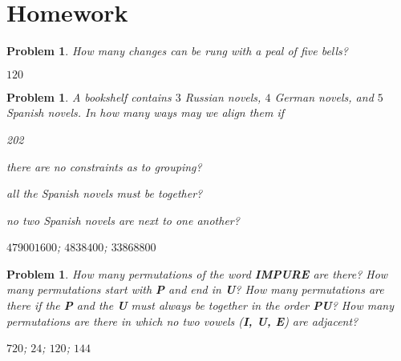 \documentclass[11pt, openany]{book}
\theoremstyle{change} \theoremheaderfont{\blue\sffamily\bfseries}
\newtheorem{pro}[thm]{Problem}
\theoremstyle{nonumberplain} \theoremheaderfont{\sffamily\bfseries}
\newcommand{\í}{\'{\i}}
\begin{document}
\section*{Homework}
\begin{multicols}{2}\columnseprule 1pt \columnsep 25pt
\begin{pro}
How many changes can be rung with a peal of five bells?
\begin{answer}$120$
\end{answer}
 \end{pro}
       \begin{pro}A bookshelf contains $3$
Russian novels, $4$ German novels, and $5$ Spanish novels. In how
many ways may we align them if\begin{dingautolist}{202} \item there
are no constraints as to grouping? \item
 all the Spanish novels must be together?  \item no
two Spanish novels are next to one  another?

\end{dingautolist}
\begin{answer}
$479001600$; $4838400$; $33868800$
\end{answer}
      \end{pro}
          \begin{pro}
How many permutations of the word {\bf IMPURE} are there? How many
permutations start with {\bf P} and end in {\bf U}?
 How many permutations are there if the {\bf P} and the {\bf U} must always be together in the order {\bf PU}?
 How many permutations are there in which no two vowels ({\bf I, U, E}) are adjacent?

\begin{answer}$720$; $24$; $120$; $144$


\end{answer}
\end{pro}
\end{multicols}
\end{document}
